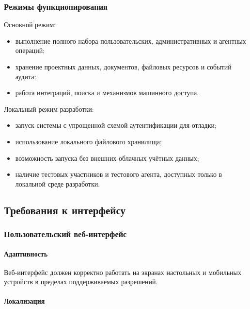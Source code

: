 \subsubsection{Режимы функционирования}

Основной режим:

\begin{itemize}
    \item выполнение полного набора пользовательских, административных и агентных операций;
    \item хранение проектных данных, документов, файловых ресурсов и событий аудита;
    \item работа интеграций, поиска и механизмов машинного доступа.
\end{itemize}

Локальный режим разработки:

\begin{itemize}
    \item запуск системы с упрощенной схемой аутентификации для отладки;
    \item использование локального файлового хранилища;
    \item возможность запуска без внешних облачных учётных данных;
    \item наличие тестовых участников и тестового агента, доступных только в локальной среде разработки.
\end{itemize}

\textheadingsep
\subsection{Требования к интерфейсу}

\headingtextsep

\subsubsection{Пользовательский веб-интерфейс}

\paragraph{Адаптивность}

Веб-интерфейс должен корректно работать на экранах настольных и мобильных устройств в пределах поддерживаемых разрешений.

\paragraph{Локализация}

